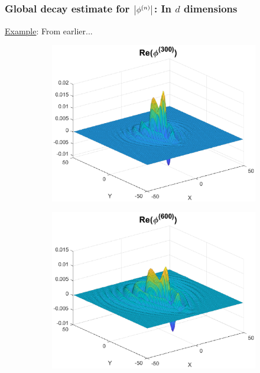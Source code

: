 \documentclass{beamer}
\theoremstyle{definition}
\begin{document}
\begin{frame}
\frametitle{Global decay estimate for $\abs{\phi^{(n)}}$: In $d$ dimensions}

\underline{Example}: From earlier...

\begin{figure}
	\begin{subfigure}{0.495\textwidth}
		\centering
		\includegraphics[width=\textwidth]{conv_ex0.eps}
	\end{subfigure}
	\begin{subfigure}{0.495\textwidth}
		\centering
		\includegraphics[width=\textwidth]{conv_ex1.eps}
	\end{subfigure}
\end{figure}

\end{frame}
\end{document}
